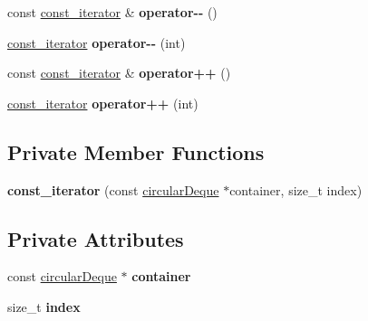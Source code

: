 \begin{DoxyCompactItemize}
\item 
\hypertarget{classcircularDeque_1_1const__iterator_af3164e3b086675a27892f4de0f5cb07a}{const \hyperlink{classcircularDeque_1_1const__iterator}{const\+\_\+iterator} \& {\bfseries operator-\/-\/} ()}\label{classcircularDeque_1_1const__iterator_af3164e3b086675a27892f4de0f5cb07a}

\item 
\hypertarget{classcircularDeque_1_1const__iterator_ae8a986da58f120a06319332eca03c106}{\hyperlink{classcircularDeque_1_1const__iterator}{const\+\_\+iterator} {\bfseries operator-\/-\/} (int)}\label{classcircularDeque_1_1const__iterator_ae8a986da58f120a06319332eca03c106}

\item 
\hypertarget{classcircularDeque_1_1const__iterator_a1e1da24d7054467036d20a00c453c219}{const \hyperlink{classcircularDeque_1_1const__iterator}{const\+\_\+iterator} \& {\bfseries operator++} ()}\label{classcircularDeque_1_1const__iterator_a1e1da24d7054467036d20a00c453c219}

\item 
\hypertarget{classcircularDeque_1_1const__iterator_a58909e8bf739c88361ba315c0b2e8e23}{\hyperlink{classcircularDeque_1_1const__iterator}{const\+\_\+iterator} {\bfseries operator++} (int)}\label{classcircularDeque_1_1const__iterator_a58909e8bf739c88361ba315c0b2e8e23}

\end{DoxyCompactItemize}
\subsection*{Private Member Functions}
\begin{DoxyCompactItemize}
\item 
\hypertarget{classcircularDeque_1_1const__iterator_ac661ca71e0cc8321160e4364884fccda}{{\bfseries const\+\_\+iterator} (const \hyperlink{classcircularDeque}{circular\+Deque} $\ast$container, size\+\_\+t index)}\label{classcircularDeque_1_1const__iterator_ac661ca71e0cc8321160e4364884fccda}

\end{DoxyCompactItemize}
\subsection*{Private Attributes}
\begin{DoxyCompactItemize}
\item 
\hypertarget{classcircularDeque_1_1const__iterator_a60e5de271a30a0e308d405d719e24415}{const \hyperlink{classcircularDeque}{circular\+Deque} $\ast$ {\bfseries container}}\label{classcircularDeque_1_1const__iterator_a60e5de271a30a0e308d405d719e24415}

\item 
\hypertarget{classcircularDeque_1_1const__iterator_ad1106c610ff36cffdc47a9cd90db6260}{size\+\_\+t {\bfseries index}}\label{classcircularDeque_1_1const__iterator_ad1106c610ff36cffdc47a9cd90db6260}

\end{DoxyCompactItemize}
